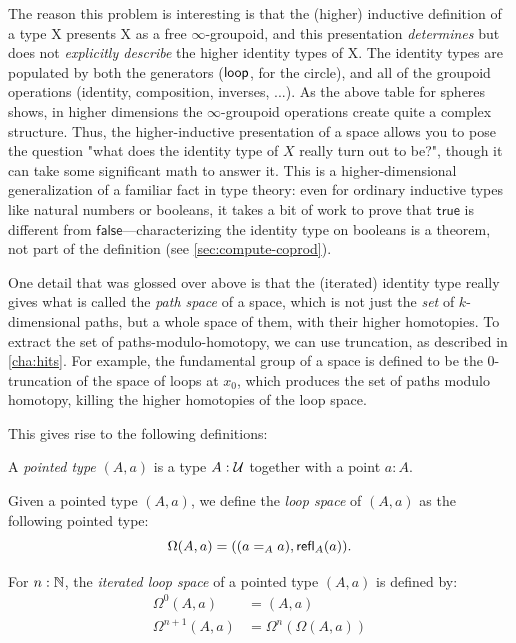 The reason this problem is interesting is that the (higher) inductive
definition of a type X presents X as a free $\infty$-groupoid, and this
presentation \emph{determines} but does not \emph{explicitly describe}
the higher identity types of X.  The identity types are populated by
both the generators ($\mathsf{loop}$, for the circle), and all of the groupoid
operations (identity, composition, inverses, ...).  As the above table
for spheres shows, in higher dimensions the $\infty$-groupoid operations
create quite a complex structure.  Thus, the higher-inductive
presentation of a space allows you to pose the question "what does the
identity type of $X$ really turn out to be?", though it can take some
significant math to answer it.  This is a higher-dimensional
generalization of a familiar fact in type theory: even for ordinary
inductive types like natural numbers or booleans, it takes a bit of work
to prove that $\mathsf{true}$ is different from $\mathsf{false}$---characterizing the
identity type on booleans is a theorem, not part of the definition
(see \autoref{sec:compute-coprod}).

One detail that was glossed over above is that the (iterated) identity
type really gives what is called the \emph{path space} of a space, which
is not just the \emph{set} of $k$-dimensional paths, but a whole space
of them, with their higher homotopies.  To extract the set of
paths-modulo-homotopy, we can use truncation, as described in
\autoref{cha:hits}.  For example, the fundamental group of a
space is defined to be the 0-truncation of the space of loops at $x_0$,
which produces the set of paths modulo homotopy, killing the higher
homotopies of the loop space.

This gives rise to the following definitions:

\begin{defn}
  A \emph{pointed type} $(A,a)$ is a type $A:\mathcal{U}$ together with a point $a:A$.
\end{defn}

\begin{defn}
  Given a pointed type $(A,a)$, we define the \emph{loop space} of $(A,a)$ as
  the following pointed type:
  \[\Omega(A,a)=((a=_Aa),\mathsf{refl}_{A}(a)).\]

  For $n:\mathbb{N}$, the \emph{iterated loop space} of a pointed type $(A,a)$ is
  defined by:
  \begin{align*}
    \Omega^0(A,a)&=(A,a)\\
    \Omega^{n+1}(A,a)&=\Omega^n(\Omega(A,a))
  \end{align*}
\end{defn}

